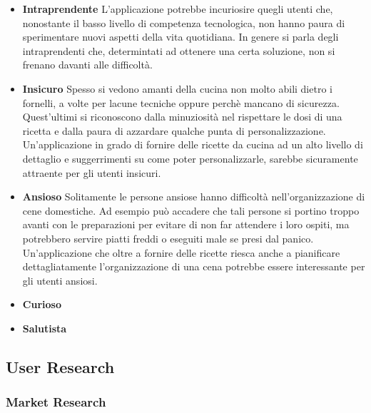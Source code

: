 \begin{itemize}
\item \textbf{Intraprendente}
L'applicazione potrebbe incuriosire quegli utenti che, nonostante il
basso livello di competenza tecnologica, non hanno paura di sperimentare
nuovi aspetti della vita quotidiana. In genere si parla degli
intraprendenti che, determintati ad ottenere una certa soluzione, non si
frenano davanti alle difficoltà.
\item \textbf{Insicuro}
Spesso si vedono amanti della cucina non molto abili dietro i fornelli,
a volte per lacune tecniche oppure perchè mancano di sicurezza.
Quest'ultimi si riconoscono dalla minuziosità nel rispettare le dosi di
una ricetta e dalla paura di azzardare qualche punta di
personalizzazione.
Un'applicazione in grado di fornire delle ricette da cucina ad un alto
livello di dettaglio e suggerrimenti su come poter personalizzarle,
sarebbe sicuramente attraente per gli utenti insicuri.
\item \textbf{Ansioso}
Solitamente le persone ansiose hanno difficoltà nell'organizzazione di
cene domestiche. Ad esempio può accadere che tali persone si portino troppo avanti
con le preparazioni per evitare di non far attendere i loro ospiti, ma
potrebbero servire piatti freddi o eseguiti male se presi dal panico.
Un'applicazione che oltre a fornire delle ricette riesca anche a
pianificare dettagliatamente l'organizzazione di una cena potrebbe essere
interessante per gli utenti ansiosi.
\item \textbf{Curioso}
\item \textbf{Salutista}
\end{itemize}


\subsection{User Research}

\subsubsection{Market Research}

